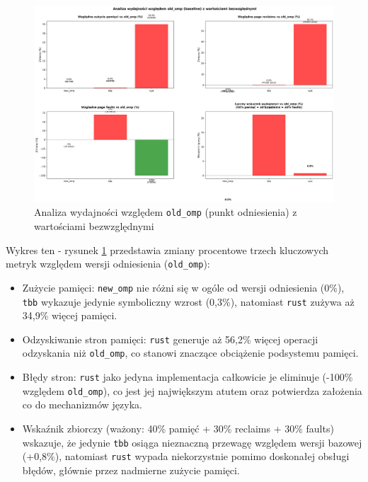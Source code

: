 \begin{figure}[H]
    \centering
    \includegraphics[width=\textwidth]{analiza/images/parallel/is/arm/chart_05_performance_ratios.png}
    \caption{Analiza wydajności względem \texttt{old\_omp} (punkt odniesienia) z wartościami bezwzględnymi}
    \label{is_analiza_wzgledem_old_omp}
\end{figure}
Wykres ten - rysunek \ref{is_analiza_wzgledem_old_omp} przedstawia zmiany procentowe trzech kluczowych metryk względem wersji odniesienia (\texttt{old\_omp}):
\begin{itemize}
    \item Zużycie pamięci: \texttt{new\_omp} nie różni się w ogóle od wersji odniesienia (0\%), \texttt{tbb} wykazuje jedynie symboliczny wzrost (0,3\%), natomiast \texttt{rust} zużywa aż 34,9\% więcej pamięci.
    \item Odzyskiwanie stron pamięci: \texttt{rust} generuje aż 56,2\% więcej operacji odzyskania niż \texttt{old\_omp}, co stanowi znaczące obciążenie podsystemu pamięci.
    \item Błędy stron: \texttt{rust} jako jedyna implementacja całkowicie je eliminuje (-100\% względem \texttt{old\_omp}), co jest jej największym atutem oraz potwierdza założenia co do mechanizmów języka.
    \item Wskaźnik zbiorczy (ważony: 40\% pamięć + 30\% reclaims + 30\% faults) wskazuje, że jedynie \texttt{tbb} osiąga nieznaczną przewagę względem wersji bazowej (+0,8\%), natomiast \texttt{rust} wypada niekorzystnie pomimo doskonałej obsługi błędów, głównie przez nadmierne zużycie pamięci.
\end{itemize}



